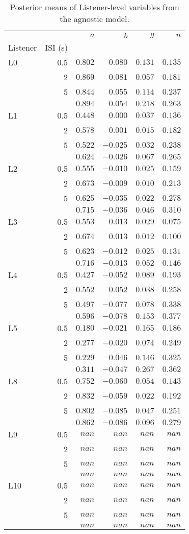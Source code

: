 \begin{table} \centering \caption{Posterior means of Listener-level variables from the agnostic model.} \label{vars} \begin{tabular}{lrrrrr} \toprule & & $a$ & $b$ & $g$ & $n$ \\ Listener & ISI (s) & & & & \\ \midrule L0 & 0.5 & $0.802$ & $0.080$ & $0.131$ & $0.135$ \\ & 2 & $0.869$ & $0.081$ & $0.057$ & $0.181$ \\ & 5 & $0.844$ & $0.055$ & $0.114$ & $0.237$ \\ & & $0.894$ & $0.054$ & $0.218$ & $0.263$ \\ L1 & 0.5 & $0.448$ & $0.000$ & $0.037$ & $0.136$ \\ & 2 & $0.578$ & $0.001$ & $0.015$ & $0.182$ \\ & 5 & $0.522$ & $-0.025$ & $0.032$ & $0.238$ \\ & & $0.624$ & $-0.026$ & $0.067$ & $0.265$ \\ L2 & 0.5 & $0.555$ & $-0.010$ & $0.025$ & $0.159$ \\ & 2 & $0.673$ & $-0.009$ & $0.010$ & $0.213$ \\ & 5 & $0.625$ & $-0.035$ & $0.022$ & $0.278$ \\ & & $0.715$ & $-0.036$ & $0.046$ & $0.310$ \\ L3 & 0.5 & $0.553$ & $0.013$ & $0.029$ & $0.075$ \\ & 2 & $0.674$ & $0.013$ & $0.012$ & $0.100$ \\ & 5 & $0.623$ & $-0.012$ & $0.025$ & $0.131$ \\ & & $0.716$ & $-0.013$ & $0.052$ & $0.146$ \\ L4 & 0.5 & $0.427$ & $-0.052$ & $0.089$ & $0.193$ \\ & 2 & $0.552$ & $-0.052$ & $0.038$ & $0.258$ \\ & 5 & $0.497$ & $-0.077$ & $0.078$ & $0.338$ \\ & & $0.596$ & $-0.078$ & $0.153$ & $0.377$ \\ L5 & 0.5 & $0.180$ & $-0.021$ & $0.165$ & $0.186$ \\ & 2 & $0.277$ & $-0.020$ & $0.074$ & $0.249$ \\ & 5 & $0.229$ & $-0.046$ & $0.146$ & $0.325$ \\ & & $0.311$ & $-0.047$ & $0.267$ & $0.362$ \\ L8 & 0.5 & $0.752$ & $-0.060$ & $0.054$ & $0.143$ \\ & 2 & $0.832$ & $-0.059$ & $0.022$ & $0.192$ \\ & 5 & $0.802$ & $-0.085$ & $0.047$ & $0.251$ \\ & & $0.862$ & $-0.086$ & $0.096$ & $0.279$ \\ L9 & 0.5 & $nan$ & $nan$ & $nan$ & $nan$ \\ & 2 & $nan$ & $nan$ & $nan$ & $nan$ \\ & 5 & $nan$ & $nan$ & $nan$ & $nan$ \\ & & $nan$ & $nan$ & $nan$ & $nan$ \\ L10 & 0.5 & $nan$ & $nan$ & $nan$ & $nan$ \\ & 2 & $nan$ & $nan$ & $nan$ & $nan$ \\ & 5 & $nan$ & $nan$ & $nan$ & $nan$ \\ & & $nan$ & $nan$ & $nan$ & $nan$ \\ \bottomrule \end{tabular} \end{table}